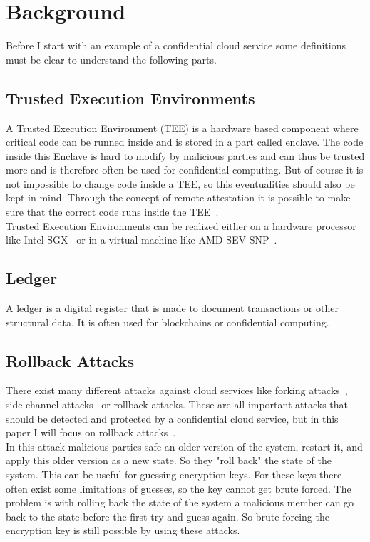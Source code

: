 \section{Background}
Before I start with an example of a confidential cloud service some definitions must be clear to understand the following parts.
\subsection{Trusted Execution Environments}
A Trusted Execution Environment (TEE) is a hardware based component where critical code can be runned inside and is stored in a part called enclave. The code inside this Enclave is hard to modify by malicious parties and can thus be trusted more and is therefore often be used for confidential computing.  But of course it is not impossible to change code inside a TEE, so this eventualities should also be kept in mind. Through the concept of remote attestation it is possible to make sure that the correct code runs inside the TEE~\cite{remoteAttestation}. \\ %
Trusted Execution Environments can be realized either on a hardware processor like Intel SGX~\cite{sgx} or in a virtual machine like AMD SEV-SNP~\cite{amd}.%
\subsection{Ledger}
A ledger is a digital register that is made to document transactions or other structural data. It is often used for blockchains or confidential computing.
\subsection{Rollback Attacks}
There exist many different attacks against cloud services like forking attacks~\cite{forkingAttacks}, side channel attacks~\cite{sideChannel} or rollback attacks. These are all important attacks that should be detected and protected by a confidential cloud service, but in this paper I will focus on rollback attacks~\cite{Rollback}.\\
In this attack malicious parties safe an older version of the system, restart it, and apply this older version as a new state. So they "roll back" the state of the system. This can be useful for guessing encryption keys. For these keys there often exist some limitations of guesses, so the key cannot get brute forced. The problem is with rolling back the state of the system a malicious member can go back to the state before the first try and guess again. So brute forcing the encryption key is still possible by using these attacks. 
